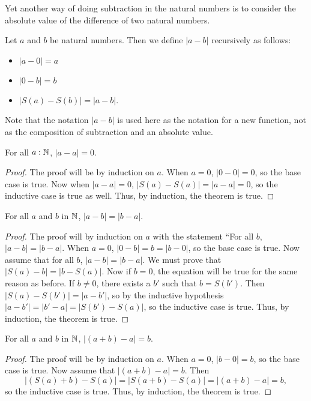 \documentclass[../math.tex]{subfiles}
\begin{document}
Yet another way of doing subtraction in the natural numbers is to consider the
absolute value of the difference of two natural numbers.

\begin{definition}
    Let $a$ and $b$ be natural numbers.  Then we define $|a - b|$ recursively as
    follows:
    \begin{itemize}
        \item $|a - 0| = a$
        \item $|0 - b| = b$
        \item $|S(a) - S(b)| = |a - b|$.
    \end{itemize}
    Note that the notation $|a - b|$ is used here as the notation for a new
    function, not as the composition of subtraction and an absolute value.
\end{definition}

\begin{theorem}
    For all $a : \mathbb{N}$, $|a - a| = 0$.
\end{theorem}
\begin{proof}
    The proof will be by induction on $a$.  When $a = 0$, $|0 - 0| = 0$, so the
    base case is true.  Now when $|a - a| = 0$, $|S(a) - S(a)| = |a - a| = 0$,
    so the inductive case is true as well.  Thus, by induction, the theorem is
    true.
\end{proof}

\begin{theorem}
    For all $a$ and $b$ in $\mathbb{N}$, $|a - b| = |b - a|$.
\end{theorem}
\begin{proof}
    The proof will by induction on $a$ with the statement ``For all $b$, $|a -
    b| = |b - a|$.  When $a = 0$, $|0 - b| = b = |b - 0|$, so the base case is
    true.  Now assume that for all $b$, $|a - b| = |b - a|$.  We must prove that
    $|S(a) - b| = |b - S(a)|$.  Now if $b = 0$, the equation will be true for
    the same reason as before.  If $b \neq 0$, there exists a $b'$ such that $b
    = S(b')$.  Then $|S(a) - S(b')| = |a - b'|$, so by the inductive hypothesis
    $|a - b'| = |b' - a| = |S(b') - S(a)|$, so the inductive case is true.
    Thus, by induction, the theorem is true.
\end{proof}

\begin{theorem}
    For all $a$ and $b$ in $\mathbb{N}$, $|(a + b) - a| = b$.
\end{theorem}
\begin{proof}
    The proof will be by induction on $a$.  When $a = 0$, $|b - 0| = b$, so the
    base case is true.  Now assume that $|(a + b) - a| = b$.  Then
    \[
        |(S(a) + b) - S(a)| = |S(a + b) - S(a)| = |(a + b) - a| = b,
    \]
    so the inductive case is true.  Thus, by induction, the theorem is true.
\end{proof}
\end{document}
